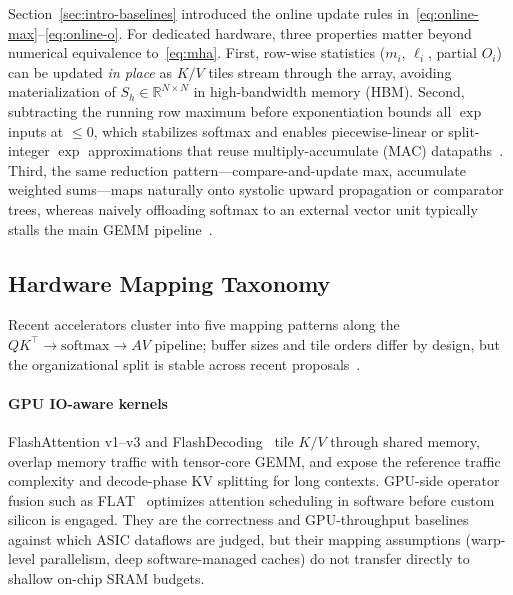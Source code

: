 \documentclass[conference]{IEEEtran}
\begin{document}
Section~\ref{sec:intro-baselines} introduced the online update rules in~\eqref{eq:online-max}--\eqref{eq:online-o}.
For dedicated hardware, three properties matter beyond numerical equivalence to~\eqref{eq:mha}.
First, row-wise statistics ($m_i$, $\ell_i$, partial $O_i$) can be updated \emph{in place} as $K/V$ tiles stream through the array, avoiding materialization of $S_h \in \mathbb{R}^{N \times N}$ in high-bandwidth memory (HBM).
Second, subtracting the running row maximum before exponentiation bounds all $\exp$ inputs at $\leq 0$, which stabilizes softmax and enables piecewise-linear or split-integer $\exp$ approximations that reuse multiply-accumulate (MAC) datapaths~\cite{lin2025systolicattention,koca2023exp}.
Third, the same reduction pattern---compare-and-update max, accumulate weighted sums---maps naturally onto systolic upward propagation or comparator trees, whereas naively offloading softmax to an external vector unit typically stalls the main GEMM pipeline~\cite{wang2023cosa,desa2025,streamattention2025}.

\subsection{Hardware Mapping Taxonomy}
\label{sec:l1-taxonomy}

Recent accelerators cluster into five mapping patterns along the $QK^\top \rightarrow \mathrm{softmax} \rightarrow AV$ pipeline; buffer sizes and tile orders differ by design, but the organizational split is stable across recent proposals~\cite{wang2023cosa,lin2025systolicattention,plena2025,flatattention2026,streamattention2025,desa2025}.

\paragraph{GPU IO-aware kernels}
FlashAttention v1--v3 and FlashDecoding~\cite{dao2022flashattention,dao2023flashattention2,shah2024flashattention3,dao2023flashdecoding} tile $K/V$ through shared memory, overlap memory traffic with tensor-core GEMM, and expose the reference traffic complexity and decode-phase KV splitting for long contexts.
GPU-side operator fusion such as FLAT~\cite{kao2023flat} optimizes attention scheduling in software before custom silicon is engaged.
They are the correctness and GPU-throughput baselines against which ASIC dataflows are judged, but their mapping assumptions (warp-level parallelism, deep software-managed caches) do not transfer directly to shallow on-chip SRAM budgets.
\end{document}
